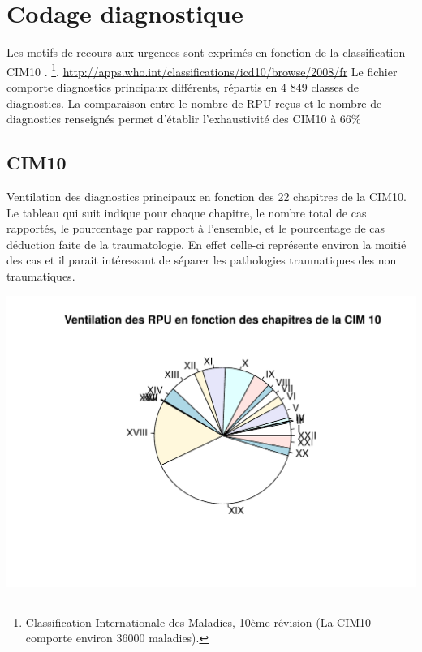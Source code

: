 \documentclass[12pt,english,french,twoside]{book}\usepackage[]{graphicx}\usepackage[]{color}
\makeatletter
\def\maxwidth{ %
  \ifdim\Gin@nat@width>\linewidth
    \linewidth
  \else
    \Gin@nat@width
  \fi
}
\newenvironment{knitrout}{}{} %
\makeatother
\begin{document}

\newpage
\chapter{Codage diagnostique}

%



Les motifs de recours aux urgences sont exprimés en fonction de la classification CIM10 \cite{10}.
\footnote{Classification Internationale des Maladies, 10ème révision (La CIM10 comporte environ 36000 maladies).}.
\url{http://apps.who.int/classifications/icd10/browse/2008/fr}
Le fichier comporte  diagnostics principaux différents, 
répartis en 4 849 classes de diagnostics.
La comparaison entre le nombre de RPU reçus et le nombre de diagnostics renseignés permet d'établir l'exhaustivité des CIM10 à 66\% 


\section{CIM10}

Ventilation des diagnostics principaux en fonction des 22 chapitres de la CIM10. Le tableau qui suit indique pour chaque chapitre, le nombre total de cas rapportés, le pourcentage par rapport à l'ensemble, et le pourcentage de cas déduction faite de la traumatologie. En effet celle-ci représente environ la moitié des cas et il parait intéressant de séparer les pathologies traumatiques des non traumatiques.

\begin{knitrout}
\color{fgcolor}
\includegraphics[width=\maxwidth]{figure/table_cim10-1} 

\end{knitrout}
\end{document}
